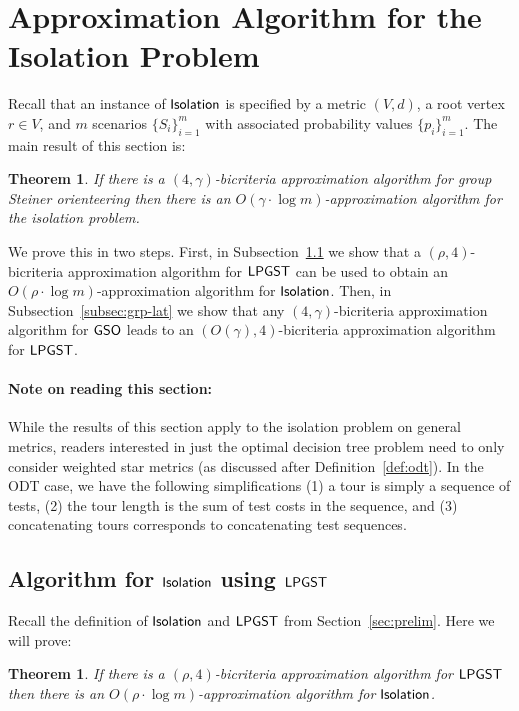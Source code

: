 \documentclass[11pt]{article}
\newtheorem{theorem}[thm]{Theorem}
\def\odt{{\sf ODT}\xspace}
\def\isoprob{\ensuremath{{\sf Isolation}}\xspace}
\def\lpgst{\ensuremath{{\sf LPGST}}\xspace}
\def\gso{\ensuremath{{\sf GSO}}\xspace}
\begin{document}
\section{Approximation Algorithm for the Isolation Problem} \label{sec:iso}



Recall that an instance of \isoprob is specified by a metric $(V,d)$, a root vertex $r\in V$, and $m$ scenarios
$\{S_i\}_{i=1}^m$ with associated probability values $\{p_i\}_{i=1}^m$. The main result of this section is:
\begin{theorem}\label{thm:isolation}
If there is a $(4,\gamma)$-bicriteria approximation algorithm for group Steiner orienteering then there is an $O(\gamma\cdot \log m)$-approximation algorithm for the isolation problem.
\end{theorem}

We prove this in two steps. First, in Subsection~\ref{subsec:iso-alg} we show that a $(\rho,4)$-bicriteria approximation algorithm for \lpgst can be used to obtain an $O(\rho\cdot \log m)$-approximation algorithm for \isoprob. Then, in Subsection~\ref{subsec:grp-lat} we show that any $(4,\gamma)$-bicriteria approximation algorithm for \gso leads to an $(O(\gamma),4)$-bicriteria approximation algorithm for \lpgst. 

\paragraph{Note on reading this section:} While the results of this section apply to the isolation problem on general metrics, 
readers interested in just the optimal decision tree problem need to only consider weighted star metrics (as discussed after Definition~\ref{def:odt}). In the \odt case, we have the following simplifications (1) a tour   is simply a sequence of tests, (2) the tour length is the sum of test costs in the  sequence, and (3) concatenating tours corresponds to concatenating test sequences. 

\subsection{Algorithm for \isoprob using \lpgst} \label{subsec:iso-alg}
Recall the definition of \isoprob and \lpgst from Section~\ref{sec:prelim}.  Here we will prove:
\begin{theorem}\label{thm:lpg-to-iso}
If there is a $(\rho,4)$-bicriteria approximation algorithm for \lpgst then there is an $O(\rho\cdot \log m)$-approximation algorithm for \isoprob.
\end{theorem}
\end{document}
